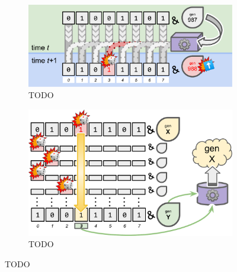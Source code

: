\begin{figure}
  \centering
  \begin{subfigure}{0.55\textwidth}
  \includegraphics[width=\textwidth]{img/surface-site-deposit}
  \caption{TODO}
  \label{fig:surface-site-deposit}
  \end{subfigure}%
  \hfill
  \begin{subfigure}{0.4\textwidth}
  \centering
  \includegraphics[width=\textwidth]{img/deposit-rank-calculation}
  \caption{TODO}
  \label{fig:deposit-rank-calculation}
  \end{subfigure}
\caption{TODO}
\end{figure}
